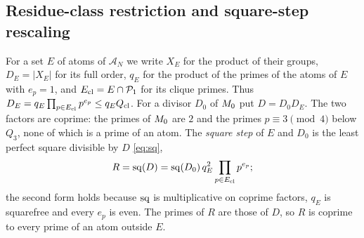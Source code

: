 \subsection{Residue-class restriction and square-step rescaling}\label{subsec:scale:fibres}

For a set $E$ of atoms of $\mathcal A_N$ we write $X_E$ for the product of
their groups, $D_E=|X_E|$ for its full order, $q_E$ for the product of the
primes of the atoms of $E$ with $e_p=1$, and $E_{\rm cl}=E\cap\mathcal P_1$
for its clique primes. Thus $D_E=q_E\prod_{p\in E_{\rm cl}}p^{e_p}\le
q_EQ_{\rm cl}$. For a divisor $D_0$ of $M_0$ put $D=D_0D_E$. The two
factors are coprime: the primes of $M_0$ are $2$ and the primes
$p\equiv3\pmod4$ below $Q_3$, none of which is a prime of an atom. The
\emph{square step} of $E$ and $D_0$ is the least perfect square divisible by
$D$ \eqref{eq:sq},
\begin{equation}\label{eq:square-step}
 R=\operatorname{sq}(D)=\operatorname{sq}(D_0)\,q_E^2\prod_{p\in E_{\rm cl}}p^{e_p};
\end{equation}
the second form holds because $\operatorname{sq}$ is multiplicative on coprime factors,
$q_E$ is squarefree and every $e_p$ is even. The primes of $R$ are those of
$D$, so $R$ is coprime to every prime of an atom outside $E$.

